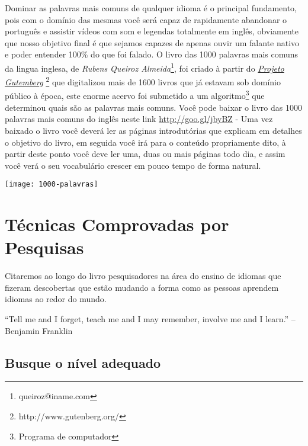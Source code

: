 Dominar as palavras mais comuns de qualquer idioma é o principal fundamento,
pois com o domínio das mesmas você será capaz de rapidamente
abandonar o português e assistir vídeos com som e legendas totalmente em
inglês, obviamente que nosso objetivo final é que sejamos capazes de apenas
ouvir um falante nativo e poder entender 100\% do que foi falado.  O livro das
1000 palavras  mais comuns da
lingua inglesa, de  {\em Rubens Queiroz
Almeida}\footnote{queiroz@iname.com}, foi criado à partir do
 \href{http://www.gutenberg.org/}{{\em Projeto Gutemberg}}%
\footnote{http://www.gutenberg.org/} que digitalizou mais de
1600 livros que já estavam sob domínio público à época, este enorme acervo foi submetido
a um algoritmo\footnote{Programa de computador} que determinou quais são
as palavras mais comuns. Você pode baixar o livro das 1000 palavras mais
comuns do inglês neste link \href{http://goo.gl/jbyBZ}{http://goo.gl/jbyBZ} - Uma vez baixado o livro
você deverá ler as páginas introdutórias que explicam em detalhes
o objetivo do livro, em seguida você irá para o conteúdo propriamente
dito, à partir deste ponto você deve ler uma, duas ou mais páginas todo
dia, e assim você verá o seu vocabulário crescer em pouco tempo de forma
natural.

\vspace{0.3\baselineskip}
\texttt{[image: 1000-palavras]}

\section{Técnicas Comprovadas por Pesquisas}

Citaremos ao longo do livro pesquisadores na área do ensino de idiomas que fizeram
descobertas que estão mudando a forma como as pessoas aprendem idiomas ao redor
do mundo.

\noindent
\vspace{0.8\baselineskip}
{\scriptsize {} ``Tell me and I forget, teach me and I may remember, involve me and I learn.'' -- Benjamin Franklin }

\subsection{Busque o nível adequado}


